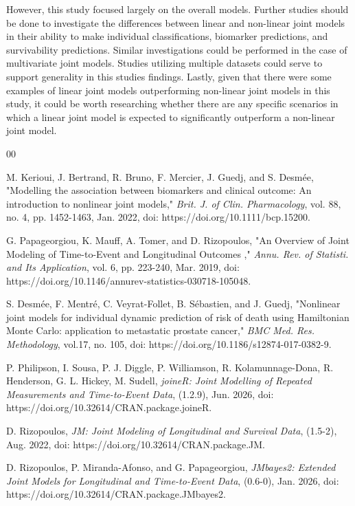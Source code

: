 \documentclass[english]{article}
\theoremstyle{plain}
\begin{document}
However, this study focused largely on the overall models. Further studies should be done to investigate the differences between linear and non-linear joint models in their ability to make individual classifications, biomarker predictions, and survivability predictions. Similar investigations could be performed in the case of multivariate joint models. Studies utilizing multiple datasets could serve to support generality in this studies findings. Lastly, given that there were some examples of linear joint models outperforming non-linear joint models in this study, it could be worth researching whether there are any specific scenarios in which a linear joint model is expected to significantly outperform a non-linear joint model.


\newpage

\begin{thebibliography}{00}


  M. Kerioui, J. Bertrand, R. Bruno, F. Mercier, J. Guedj, and S. Desm\'ee, "Modelling the association between biomarkers and clinical outcome: An introduction to nonlinear joint models," \emph{Brit. J. of Clin. Pharmacology}, vol. 88, no. 4, pp. 1452-1463, Jan. 2022, doi: https://doi.org/10.1111/bcp.15200.

 G. Papageorgiou, K. Mauff, A. Tomer, and D. Rizopoulos, "An Overview of Joint Modeling of Time-to-Event and Longitudinal Outcomes ," \emph{ Annu. Rev. of Statisti. and Its Application}, vol. 6, pp. 223-240, Mar. 2019, doi: https://doi.org/10.1146/annurev-statistics-030718-105048.

 S. Desm\'ee, F. Mentr\'e, C. Veyrat-Follet, B. S\'ebastien, and J. Guedj, "Nonlinear joint models for individual dynamic prediction of risk of death using Hamiltonian Monte Carlo: application to metastatic prostate cancer," \emph{BMC Med. Res. Methodology}, vol.17, no. 105, doi: https://doi.org/10.1186/s12874-017-0382-9.


 P. Philipson, I. Sousa, P. J. Diggle, P. Williamson, R. Kolamunnage-Dona, R. Henderson, G. L. Hickey, M. Sudell, \emph{joineR: Joint Modelling of Repeated Measurements and Time-to-Event Data}, (1.2.9), Jun. 2026, doi: https://doi.org/10.32614/CRAN.package.joineR.

 D. Rizopoulos, \emph{JM: Joint Modeling of Longitudinal and Survival Data}, (1.5-2), Aug. 2022, doi: https://doi.org/10.32614/CRAN.package.JM.

 D. Rizopoulos, P. Miranda-Afonso, and G. Papageorgiou, \emph{JMbayes2: Extended Joint Models for Longitudinal and Time-to-Event Data}, (0.6-0), Jan. 2026, doi: https://doi.org/10.32614/CRAN.package.JMbayes2.


\end{thebibliography}
\end{document}
